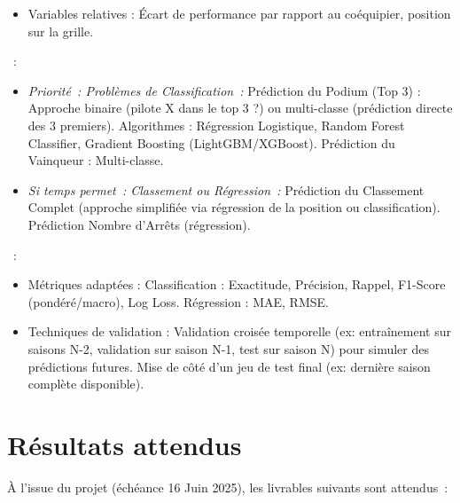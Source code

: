 \documentclass[11pt, a4paper]{article}
\newcommand{\endDate}{16 Juin 2025}
\begin{document}
\begin{description}[style=standard, itemsep=0.5em, labelwidth=!, leftmargin=1.5em, font=\normalfont]
\begin{itemize}[label=\textbullet, itemsep=0.2em, leftmargin=*]
            \item Variables relatives : Écart de performance par rapport au coéquipier, position sur la grille.
        \end{itemize}
    \item[Modélisation (Machine Learning)]~:
        \begin{itemize}[label=\textbullet, itemsep=0.2em, leftmargin=*]
            \item \textit{Priorité~: Problèmes de Classification~:}
                \subitem Prédiction du Podium (Top 3) : Approche binaire (pilote X dans le top 3 ?) ou multi-classe (prédiction directe des 3 premiers). Algorithmes : Régression Logistique, Random Forest Classifier, Gradient Boosting (LightGBM/XGBoost).
                \subitem Prédiction du Vainqueur : Multi-classe.
            \item \textit{Si temps permet~: Classement ou Régression~:}
                 \subitem Prédiction du Classement Complet (approche simplifiée via régression de la position ou classification).
                 \subitem Prédiction Nombre d'Arrêts (régression).
        \end{itemize}
    \item[Évaluation des Modèles]~:
        \begin{itemize}[label=\textbullet, itemsep=0.2em, leftmargin=*]
            \item Métriques adaptées :
                \subitem Classification : Exactitude, Précision, Rappel, F1-Score (pondéré/macro), Log Loss.
                \subitem Régression : MAE, RMSE.
            \item Techniques de validation : Validation croisée temporelle (ex: entraînement sur saisons N-2, validation sur saison N-1, test sur saison N) pour simuler des prédictions futures. Mise de côté d'un jeu de test final (ex: dernière saison complète disponible).
        \end{itemize}
\end{description}

\section{Résultats attendus}

À l'issue du projet (échéance \endDate), les livrables suivants sont attendus~:
\end{document}
